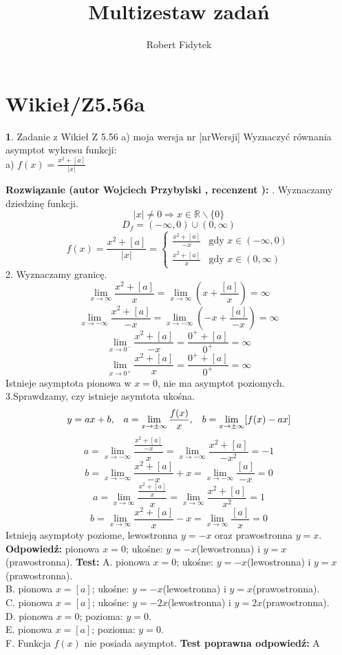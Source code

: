 \documentclass[12pt, a4paper]{article}
\title{Multizestaw zadań}
\author{Robert Fidytek}
\date{}
\theoremstyle{definition} %
\newtheorem{zad}{}
\newcommand{\kategoria}[1]{\section{#1}} %
\newcommand{\zadStart}[1]{\begin{zad}#1\newline} %
\newcommand{\zadStop}{\end{zad}}   %
\newcommand{\rozwStart}[2]{\noindent \textbf{Rozwiązanie (autor #1 , recenzent #2): }\newline} %
\newcommand{\rozwStop}{\newline}                                            %
\newcommand{\odpStart}{\noindent \textbf{Odpowiedź:}\newline}    %
\newcommand{\odpStop}{\newline}                                             %
\newcommand{\testStart}{\noindent \textbf{Test:}\newline} %
\newcommand{\testStop}{\newline} %
\newcommand{\kluczStart}{\noindent \textbf{Test poprawna odpowiedź:}\newline} %
\newcommand{\kluczStop}{\newline} %
\begin{document}
\maketitle


\kategoria{Wikieł/Z5.56a}
\zadStart{Zadanie z Wikieł Z 5.56 a) moja wersja nr [nrWersji]}
Wyznaczyć równania asymptot wykresu funkcji:\\
a) $f(x)=\frac{x^2+[a]}{|x|}$
\zadStop
\rozwStart{Wojciech Przybylski}{}
1. Wyznaczamy dziedzinę funkcji.
$$|x|\neq0 \Rightarrow x\in\mathbb{R}\backslash\{0\}$$
$$D_{f}=(-\infty,0)\cup(0,\infty)$$
$$
f(x)=\frac{x^2+[a]}{|x|} = \left\{ \begin{array}{ll}
\frac{x^2+[a]}{-x} & \textrm{gdy $x\in(-\infty,0)$}\\
\frac{x^2+[a]}{x} & \textrm{gdy $x\in(0,\infty)$}
\end{array} \right.
$$
2. Wyznaczamy granicę. 
$$\lim_{x\to\infty}\frac{x^2+[a]}{x}=\lim_{x\to\infty}(x+\frac{[a]}{x})=\infty$$
$$\lim_{x\to-\infty}\frac{x^2+[a]}{-x}=\lim_{x\to-\infty}(-x+\frac{[a]}{-x})=\infty$$
$$\lim_{x\to0^{-}}\frac{x^2+[a]}{-x}=\frac{0^{+}+[a]}{0^{+}}=\infty$$
$$\lim_{x\to0^{+}}\frac{x^2+[a]}{x}=\frac{0^{+}+[a]}{0^{+}}=\infty$$
Istnieje asymptota pionowa w $x=0$, nie ma asymptot poziomych.\\
3.Sprawdzamy, czy istnieje asymtota ukośna.
$$y=ax+b,\hspace{3mm}a=\lim_{x\to\pm\infty}\frac{f(x)}{x},\hspace{3mm}b=\lim_{x\to\pm\infty}[f(x)-ax]$$
$$a=\lim_{x\to-\infty}\frac{\frac{x^2+[a]}{-x}}{x}=\lim_{x\to-\infty}\frac{x^2+[a]}{-x^{2}}=-1$$
$$b=\lim_{x\to-\infty}\frac{x^2+[a]}{-x}+x=\lim_{x\to-\infty}\frac{[a]}{-x}=0$$
$$a=\lim_{x\to\infty}\frac{\frac{x^2+[a]}{x}}{x}=\lim_{x\to\infty}\frac{x^2+[a]}{x^{2}}=1$$
$$b=\lim_{x\to\infty}\frac{x^2+[a]}{x}-x=\lim_{x\to\infty}\frac{[a]}{x}=0$$
Istnieją asymptoty poziome, lewostronna $y=-x$ oraz prawostronna $y=x$.
\rozwStop
\odpStart
pionowa $x=0$; ukośne: $y=-x$(lewostronna) i $y=x$(prawostronna).
\odpStop
\testStart
A. pionowa $x=0$; ukośne: $y=-x$(lewostronna) i $y=x$(prawostronna).\\
B. pionowa $x=[a]$; ukośne: $y=-x$(lewostronna) i $y=x$(prawostronna).\\
C. pionowa $x=[a]$; ukośne: $y=-2x$(lewostronna) i $y=2x$(prawostronna).\\
D. pionowa $x=0$; pozioma: $y=0$.\\
E. pionowa $x=[a]$; pozioma: $y=0$.\\
F. Funkcja $f(x)$ nie posiada asymptot.
\testStop
\kluczStart
A
\kluczStop
\end{document}
